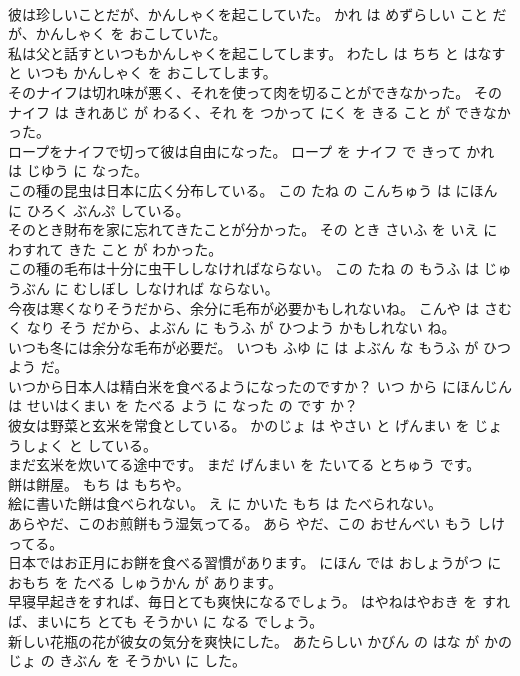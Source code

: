 \documentclass[8pt]{extreport}
\begin{document}
\begin{CJK}{UTF8}{min}
\\	彼は珍しいことだが、かんしゃくを起こしていた。	かれ は めずらしい こと だが、かんしゃく を おこしていた。	
\\	私は父と話すといつもかんしゃくを起こしてします。	わたし は ちち と はなす と いつも かんしゃく を おこしてします。	
\\	そのナイフは切れ味が悪く、それを使って肉を切ることができなかった。	その ナイフ は きれあじ が わるく、それ を つかって にく を きる こと が できなかった。	
\\	ロープをナイフで切って彼は自由になった。	ロープ を ナイフ で きって かれ は じゆう に なった。	
\\	この種の昆虫は日本に広く分布している。	この たね の こんちゅう は にほん に ひろく ぶんぷ している。	
\\	そのとき財布を家に忘れてきたことが分かった。	その とき さいふ を いえ に わすれて きた こと が わかった。	
\\	この種の毛布は十分に虫干ししなければならない。	この たね の もうふ は じゅうぶん に むしぼし しなければ ならない。	
\\	今夜は寒くなりそうだから、余分に毛布が必要かもしれないね。	こんや は さむく なり そう だから、よぶん に もうふ が ひつよう かもしれない ね。	
\\	いつも冬には余分な毛布が必要だ。	いつも ふゆ に は よぶん な もうふ が ひつよう だ。	
\\	いつから日本人は精白米を食べるようになったのですか？	いつ から にほんじん は せいはくまい を たべる よう に なった の です か？	
\\	彼女は野菜と玄米を常食としている。	かのじょ は やさい と げんまい を じょうしょく と している。	
\\	まだ玄米を炊いてる途中です。	まだ げんまい を たいてる とちゅう です。	
\\	餅は餅屋。	もち は もちや。	
\\	絵に書いた餅は食べられない。	え に かいた もち は たべられない。	
\\	あらやだ、このお煎餅もう湿気ってる。	あら やだ、この おせんべい もう しけってる。	
\\	日本ではお正月にお餅を食べる習慣があります。	にほん では おしょうがつ に おもち を たべる しゅうかん が あります。	
\\	早寝早起きをすれば、毎日とても爽快になるでしょう。	はやねはやおき を すれば、まいにち とても そうかい に なる でしょう。	
\\	新しい花瓶の花が彼女の気分を爽快にした。	あたらしい かびん の はな が かのじょ の きぶん を そうかい に した。	

\end{CJK}
\end{document}
